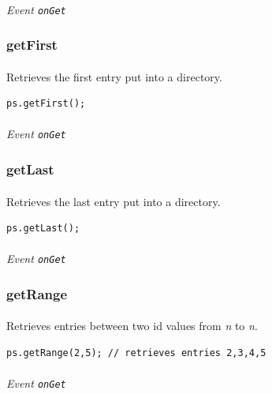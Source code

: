 \documentclass{report}
\begin{document}
\paragraph{}
\textit{Event \texttt{onGet}}


\subsubsection{getFirst}
\paragraph{}
Retrieves the first entry put into a directory.
\begin{Verbatim}[frame=single]
 ps.getFirst();
\end{Verbatim}

\paragraph{}
\textit{Event \texttt{onGet}}

\subsubsection{getLast}
\paragraph{}
Retrieves the last entry put into a directory.
\begin{Verbatim}[frame=single]
 ps.getLast();
\end{Verbatim}

\paragraph{}
\textit{Event \texttt{onGet}}

\subsubsection{getRange}
\paragraph{}
Retrieves entries between two id values from \textit{n} to \textit{n}.
\begin{Verbatim}[frame=single]
 ps.getRange(2,5); // retrieves entries 2,3,4,5
\end{Verbatim}

\paragraph{}
\textit{Event \texttt{onGet}}
\end{document}
